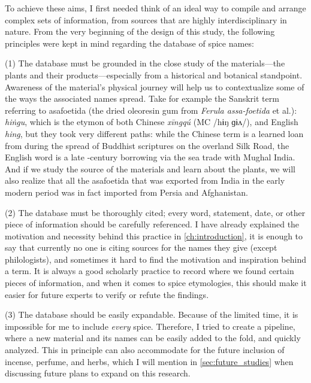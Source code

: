 To achieve these aims, I first needed think of an ideal way to compile and arrange complex sets of information, from sources that are highly interdisciplinary in nature. From the very beginning of the design of this study, the following principles were kept in mind regarding the database of spice names:

(1) The database must be grounded in the close study of the materials---the plants and their products---especially from a historical and botanical standpoint. Awareness of the material's physical journey will help us to contextualize some of the ways the associated names spread. Take for example the Sanskrit term referring to asafoetida (the dried oleoresin gum from \textit{Ferula assa-foetida} et al.):  \textit{hiṅgu}, which is the etymon of both Chinese  \textit{xīngqú} (\gls{MC} /hɨŋ ɡɨʌ/),
and English \textit{hing}, but they took very different paths: while the Chinese term is a learned loan from during the spread of Buddhist scriptures on the overland Silk Road, the English word is a late -century borrowing via the sea trade with Mughal India. And if we study the source of the materials and learn about the plants, we will also realize that all the asafoetida that was exported from India in the early modern period was in fact imported from Persia and Afghanistan.

(2) The database must be thoroughly cited; every word, statement, date, or other piece of information should be carefully referenced. I have already explained the motivation and necessity behind this practice in \cref{ch:introduction}, it is enough to say that currently no one is citing sources for the names they give (except philologists), and sometimes it hard to find the motivation and inspiration behind a term. It is always a good scholarly practice to record where we found certain pieces of information, and when it comes to spice etymologies, this should make it easier for future experts to verify or refute the findings.

(3) The database should be easily expandable. Because of the limited time, it is impossible for me to include \emph{every} spice. Therefore, I tried to create a pipeline, where a new material and its names can be easily added to the fold, and quickly analyzed. This in principle can also accommodate for the future inclusion of incense, perfume, and herbs, which I will mention in \cref{sec:future_studies} when discussing future plans to expand on this research.

